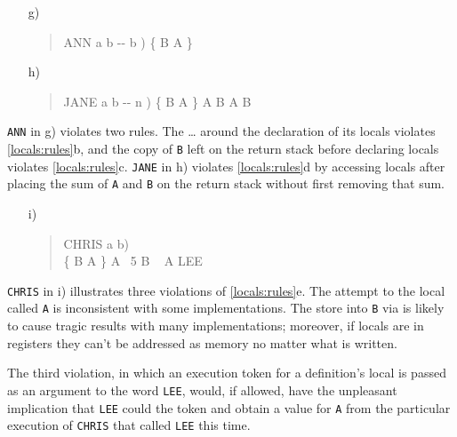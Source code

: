 \begin{intro}
\begin{enumerate}
\item[g)] \begin{quote}\ttfamily
	\word{:} ANN  a b -{}- b )
		   
		\{ B A \}   \word{;}
	\end{quote}

\item[h)] \begin{quote}\ttfamily
	\word{:} JANE  a b -{}- n )
		\{ B A \} A B \word{+}  A B \word{-} ~ \word{/} \word{;}
	\end{quote}
\end{enumerate}

\texttt{ANN} in g) violates two rules. The  {\ldots} 
around the declaration of its locals violates \ref{locals:rules}b, and
the copy of \texttt{B} left on the return stack before declaring locals
violates \ref{locals:rules}c. \texttt{JANE} in h) violates
\ref{locals:rules}d by accessing locals after placing the sum of
\texttt{A} and \texttt{B} on the return stack without first removing
that sum.

\begin{enumerate}
\item[i)] \begin{quote}\ttfamily
	\word{:} CHRIS  a b) \\
	\tab \{ B A \} \word{[']} A 
		~5 \word{[']} B  \word{!}
		~\word{[}  A \word{]}  LEE
	\word{;}
	\end{quote}
\end{enumerate}

\texttt{CHRIS} in i) illustrates three violations of
\ref{locals:rules}e. The attempt to  the local called
\texttt{A} is inconsistent with some implementations. The store into
\texttt{B} via  is likely to cause tragic results with
many implementations; moreover, if locals are in registers they can't
be addressed as memory no matter what is written.

The third violation, in which an execution token for a definition's
local is passed as an argument to the word \texttt{LEE}, would, if
allowed, have the unpleasant implication that \texttt{LEE} could
 the token and obtain a value for \texttt{A} from the
particular execution of \texttt{CHRIS} that called \texttt{LEE} this
time.

\end{intro}

